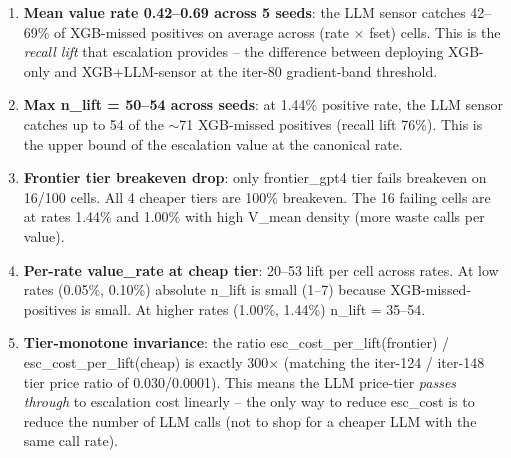 \documentclass{article}
\begin{document}
\begin{enumerate}
  \item \textbf{Mean value rate 0.42--0.69 across 5 seeds}: the LLM
    sensor catches 42--69\% of XGB-missed positives on average across
    (rate $\times$ fset) cells.  This is the \emph{recall lift} that
    escalation provides -- the difference between deploying XGB-only
    and XGB+LLM-sensor at the iter-80 gradient-band threshold.

  \item \textbf{Max n\_lift = 50--54 across seeds}: at 1.44\% positive
    rate, the LLM sensor catches up to 54 of the $\sim$71 XGB-missed
    positives (recall lift 76\%).  This is the upper bound of the
    escalation value at the canonical rate.

  \item \textbf{Frontier tier breakeven drop}: only frontier\_gpt4
    tier fails breakeven on 16/100 cells.  All 4 cheaper tiers are
    100\% breakeven.  The 16 failing cells are at rates 1.44\% and
    1.00\% with high V\_mean density (more waste calls per value).

  \item \textbf{Per-rate value\_rate at cheap tier}: 20--53 lift per
    cell across rates.  At low rates (0.05\%, 0.10\%) absolute n\_lift
    is small (1--7) because XGB-missed-positives is small.  At higher
    rates (1.00\%, 1.44\%) n\_lift = 35--54.

  \item \textbf{Tier-monotone invariance}: the ratio
    esc\_cost\_per\_lift(frontier) / esc\_cost\_per\_lift(cheap) is
    exactly 300$\times$ (matching the iter-124 / iter-148 tier price
    ratio of 0.030/0.0001).  This means the LLM price-tier
    \emph{passes through} to escalation cost linearly -- the only way
    to reduce esc\_cost is to reduce the number of LLM calls (not to
    shop for a cheaper LLM with the same call rate).
\end{enumerate}
\end{document}
